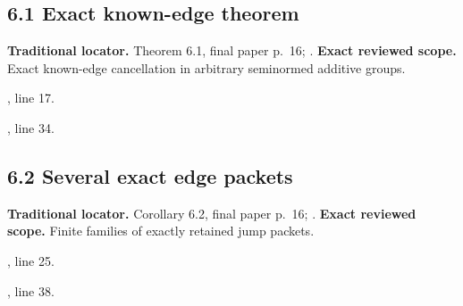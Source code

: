 \subsection{6.1 Exact known-edge theorem}
\label{result:6.1}
\textbf{Traditional locator.} Theorem 6.1, final paper p.~16; .
\textbf{Exact reviewed scope.} Exact known-edge cancellation in arbitrary seminormed additive groups.
{\small{}\par}
{\footnotesize\color{muted}, line 17.\par}\smallskip
{\small{}\par}
{\footnotesize\color{muted}, line 34.\par}\smallskip
{}
\subsection{6.2 Several exact edge packets}
\label{result:6.2}
\textbf{Traditional locator.} Corollary 6.2, final paper p.~16; .
\textbf{Exact reviewed scope.} Finite families of exactly retained jump packets.
{\small{}\par}
{\footnotesize\color{muted}, line 25.\par}\smallskip
{\small{}\par}
{\footnotesize\color{muted}, line 38.\par}\smallskip
{}
